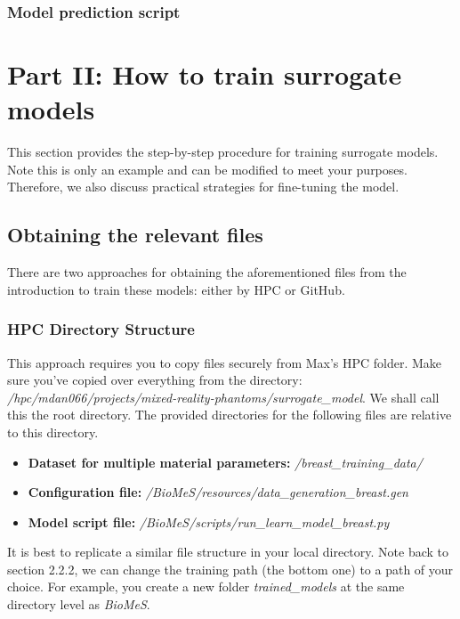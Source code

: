 \documentclass[11pt]{article}
\providecommand{\tightlist}{%
      \setlength{\itemsep}{0pt}\setlength{\parskip}{0pt}}
\begin{document}
\subsubsection{Model prediction script}


\pagebreak

\section{Part II: How to train surrogate models}
This section provides the step-by-step procedure for training surrogate models. Note this is only an example and can be modified to meet your purposes. Therefore, we also discuss practical strategies for fine-tuning the model. 

\subsection{Obtaining the relevant files}
There are two approaches for obtaining the aforementioned files from the introduction to train these models: either by HPC or GitHub. 

\subsubsection{HPC Directory Structure}
This approach requires you to copy files securely from Max's HPC folder. Make sure you've copied over everything from the directory: \textit{/hpc/mdan066/projects/mixed-reality-phantoms/surrogate\_model}. We shall call this the root directory. The provided directories for the following files are relative to this directory. 

\begin{itemize}
\tightlist
\item 
\textbf{Dataset for multiple material parameters:} \textit{/breast\_training\_data/}

\item
\textbf{Configuration file:} \textit{/BioMeS/resources/data\_generation\_breast.gen}

\item
\textbf{Model script file:} \textit{/BioMeS/scripts/run\_learn\_model\_breast.py}

\end{itemize}

It is best to replicate a similar file structure in your local directory. Note back to section 2.2.2, we can change the training path (the bottom one) to a path of your choice. For example, you create a new folder \textit{trained\_models} at the same directory level as \textit{BioMeS}. 
\end{document}
